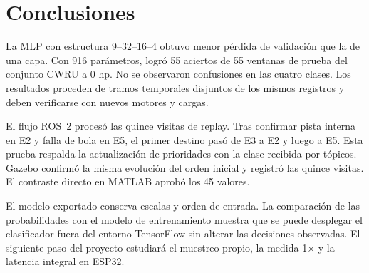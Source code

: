 \documentclass[conference,letterpaper]{IEEEtran}
\begin{document}
\section{Conclusiones}
La MLP con estructura 9--32--16--4 obtuvo menor pérdida de validación que la de una capa. Con 916 parámetros, logró 55 aciertos de 55 ventanas de prueba del conjunto CWRU a 0 hp. No se observaron confusiones en las cuatro clases. Los resultados proceden de tramos temporales disjuntos de los mismos registros y deben verificarse con nuevos motores y cargas.

El flujo ROS~2 procesó las quince visitas de replay. Tras confirmar pista interna en E2 y falla de bola en E5, el primer destino pasó de E3 a E2 y luego a E5. Esta prueba respalda la actualización de prioridades con la clase recibida por tópicos. Gazebo confirmó la misma evolución del orden inicial y registró las quince visitas. El contraste directo en MATLAB aprobó los 45 valores.

El modelo exportado conserva escalas y orden de entrada. La comparación de las probabilidades con el modelo de entrenamiento muestra que se puede desplegar el clasificador fuera del entorno TensorFlow sin alterar las decisiones observadas. El siguiente paso del proyecto estudiará el muestreo propio, la medida 1× y la latencia integral en ESP32.
\end{document}
